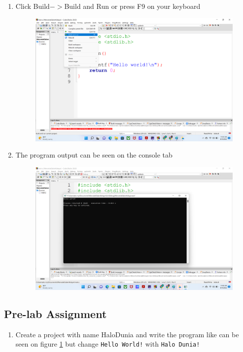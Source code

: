 \begin{enumerate}
\begin{figure}[H]
	\caption{}
	\label{fig:screenshot008}
\end{figure}
\item Click Build$->$Build and Run or press F9 on your keyboard
\begin{figure}[H]
	\centering
	\includegraphics[width=0.7\linewidth]{../P1/img/screenshot009.png}
	\caption{}
	\label{fig:screenshot009}
\end{figure}
\item The program output can be seen on the console tab
\begin{figure}[H]
	\centering
	\includegraphics[width=0.7\linewidth]{../P1/img/screenshot010.png}
	\caption{}
	\label{fig:screenshot010}
\end{figure}
\end{enumerate}

\subsection{Pre-lab Assignment}
\begin{enumerate}
	\item Create a project with name HaloDunia and write the program like can be seen on figure \ref{fig:screenshot008} but change \verb|Hello World!| with \verb|Halo Dunia!|
\end{enumerate}

